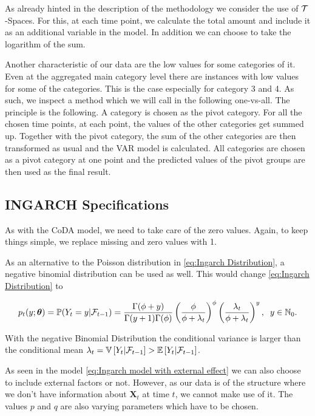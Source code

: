 As already hinted in the description of the methodology we consider the use of $\mathcal{T}$-Spaces. For this, at each time point, we calculate the total amount and include it as an additional variable in the model. In addition we can choose to take the logarithm of the sum. 

Another characteristic of our data are the low values for some categories of it. Even at the aggregated main category level there are instances with low values for some of the categories. This is the case especially for category 3 and 4. As such, we inspect a method which we will call in the following one-vs-all. The principle is the following. A category is chosen as the pivot category. For all the chosen time points, at each point, the values of the other categories get summed up. Together with the pivot category, the sum of the other categories are then transformed as usual and the VAR model is calculated. All categories are chosen as a pivot category at one point and the predicted values of the pivot groups are then used as the final result. 


\subsection{INGARCH Specifications}
\label{sec: Ingarch Specifications}

As with the CoDA model, we need to take care of the zero values. Again, to keep things simple, we replace missing and zero values with 1. 

As an alternative to the Poisson distribution in \ref{eq:Ingarch Distribution}, a negative binomial distribution can be used as well. This would change \ref{eq:Ingarch Distribution} to 

\begin{equation*}
p_t(y;\bm{\theta})=\mathbb{P}(Y_t=y | \mathcal{F}_{t-1}) = \frac{\Gamma(\phi+y)}{\Gamma(y+1)\Gamma(\phi)}\left(\frac{\phi}{\phi+\lambda_t}\right)^\phi\left(\frac{\lambda_t}{\phi+\lambda_t}\right)^y, \hspace{0.2cm} y \in \mathbb{N}_0.
\label{eq:Ingarch negbinom Distribution}
\end{equation*}

With the negative Binomial Distribution the conditional variance is larger than the conditional mean $\lambda_t = \mathbb{V}\left[Y_t | \mathcal{F}_{t-1}\right] > \mathbb{E}\left[Y_t | \mathcal{F}_{t-1}\right]$.

As seen in the model \ref{eq:Ingarch model with external effect} we can also choose to include external factors or not. However, as our data is of the structure where we don't have information about $\bm{X}_t$ at time $t$, we cannot make use of it. The values $p$ and $q$ are also varying parameters which have to be chosen. 


